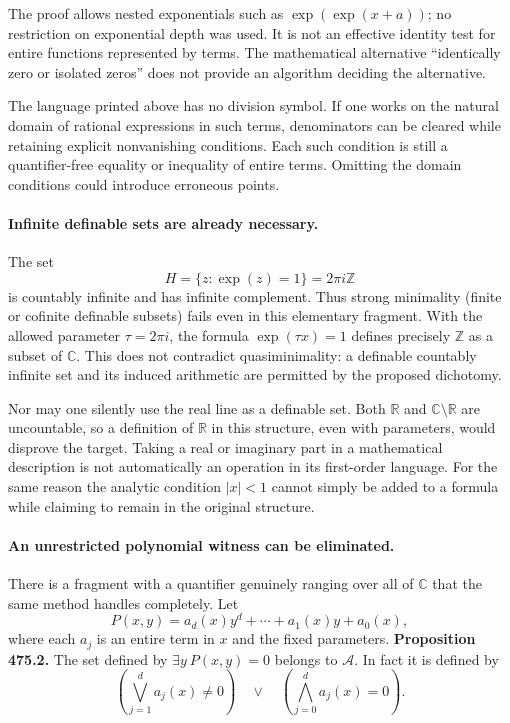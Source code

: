 \documentclass[11pt]{article}
\begin{document}
The proof allows nested exponentials such as
$\exp(\exp(x+a))$; no restriction on exponential depth was used. It is
not an effective identity test for entire functions represented by terms.
The mathematical alternative ``identically zero or isolated zeros''
does not provide an algorithm deciding the alternative.

The language printed above has no division symbol. If one works on the
natural domain of rational expressions in such terms, denominators can
be cleared while retaining explicit nonvanishing conditions. Each such
condition is still a quantifier-free equality or inequality of entire
terms. Omitting the domain conditions could introduce erroneous points.

\paragraph{Infinite definable sets are already necessary.}
The set
\[
 H=\{z:\exp(z)=1\}=2\pi i\mathbb Z
\]
is countably infinite and has infinite complement. Thus strong minimality
(finite or cofinite definable subsets) fails even in this elementary
fragment. With the allowed parameter $\tau=2\pi i$, the formula
$\exp(\tau x)=1$ defines precisely $\mathbb Z$ as a subset of $\mathbb C$.
This does not contradict quasiminimality: a definable countably infinite
set and its induced arithmetic are permitted by the proposed dichotomy.

Nor may one silently use the real line as a definable set. Both
$\mathbb R$ and $\mathbb C\setminus\mathbb R$ are uncountable, so a
definition of $\mathbb R$ in this structure, even with parameters, would
disprove the target. Taking a real or imaginary part in a mathematical
description is not automatically an operation in its first-order language.
For the same reason the analytic condition $|x|<1$ cannot simply be added
to a formula while claiming to remain in the original structure.

\paragraph{An unrestricted polynomial witness can be eliminated.}
There is a fragment with a quantifier genuinely ranging over all of
$\mathbb C$ that the same method handles completely. Let
\[
 P(x,y)=a_d(x)y^d+\cdots+a_1(x)y+a_0(x),
\]
where each $a_j$ is an entire term in $x$ and the fixed parameters.
\textbf{Proposition 475.2.} The set defined by $\exists y\ P(x,y)=0$
belongs to $\mathcal A$. In fact it is defined by
\[
 \left(\bigvee_{j=1}^{d}a_j(x)\ne0\right)
 \quad\vee\quad
 \left(\bigwedge_{j=0}^{d}a_j(x)=0\right).
\]
\end{document}
